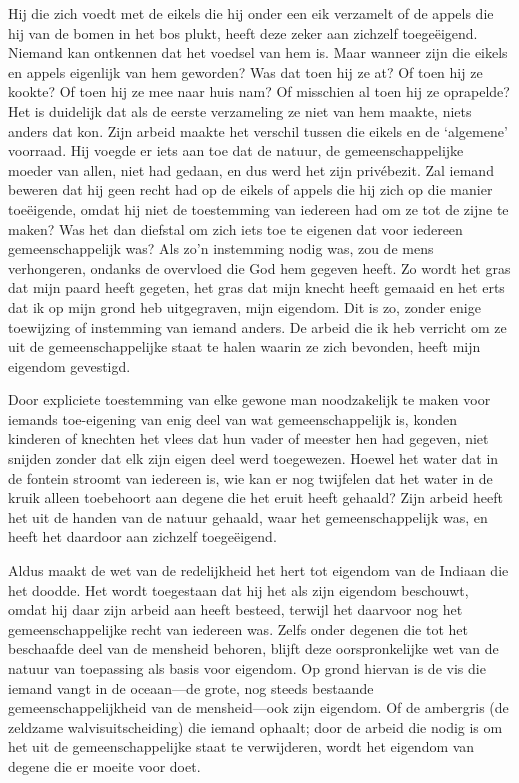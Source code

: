 \documentclass[
  a5paper,
  smalldemyvopaper,10pt,twoside,onecolumn,openright,extrafontsizes,hidelinks]{memoir}
\renewenvironment{quote}%
               {\list{}{\rightmargin=.6cm\leftmargin=.6cm}%
                \itshape \item[]}%
               {\endlist}
\begin{document}
\begin{quote}
Hij die zich voedt met de eikels die hij onder een eik verzamelt of de
appels die hij van de bomen in het bos plukt, heeft deze zeker aan
zichzelf toegeëigend. Niemand kan ontkennen dat het voedsel van hem is.
Maar wanneer zijn die eikels en appels eigenlijk van hem geworden? Was
dat toen hij ze at? Of toen hij ze kookte? Of toen hij ze mee naar huis
nam? Of misschien al toen hij ze oprapelde? Het is duidelijk dat als de
eerste verzameling ze niet van hem maakte, niets anders dat kon. Zijn
arbeid maakte het verschil tussen die eikels en de `algemene' voorraad.
Hij voegde er iets aan toe dat de natuur, de gemeenschappelijke moeder
van allen, niet had gedaan, en dus werd het zijn privébezit. Zal iemand
beweren dat hij geen recht had op de eikels of appels die hij zich op
die manier toeëigende, omdat hij niet de toestemming van iedereen had om
ze tot de zijne te maken? Was het dan diefstal om zich iets toe te
eigenen dat voor iedereen gemeenschappelijk was? Als zo'n instemming
nodig was, zou de mens verhongeren, ondanks de overvloed die God hem
gegeven heeft. Zo wordt het gras dat mijn paard heeft gegeten, het gras
dat mijn knecht heeft gemaaid en het erts dat ik op mijn grond heb
uitgegraven, mijn eigendom. Dit is zo, zonder enige toewijzing of
instemming van iemand anders. De arbeid die ik heb verricht om ze uit de
gemeenschappelijke staat te halen waarin ze zich bevonden, heeft mijn
eigendom gevestigd.

Door expliciete toestemming van elke gewone man noodzakelijk te maken
voor iemands toe-eigening van enig deel van wat gemeenschappelijk is,
konden kinderen of knechten het vlees dat hun vader of meester hen had
gegeven, niet snijden zonder dat elk zijn eigen deel werd toegewezen.
Hoewel het water dat in de fontein stroomt van iedereen is, wie kan er
nog twijfelen dat het water in de kruik alleen toebehoort aan degene die
het eruit heeft gehaald? Zijn arbeid heeft het uit de handen van de
natuur gehaald, waar het gemeenschappelijk was, en heeft het daardoor
aan zichzelf toegeëigend.

Aldus maakt de wet van de redelijkheid het hert tot eigendom van de
Indiaan die het doodde. Het wordt toegestaan dat hij het als zijn
eigendom beschouwt, omdat hij daar zijn arbeid aan heeft besteed,
terwijl het daarvoor nog het gemeenschappelijke recht van iedereen was.
Zelfs onder degenen die tot het beschaafde deel van de mensheid behoren,
blijft deze oorspronkelijke wet van de natuur van toepassing als basis
voor eigendom. Op grond hiervan is de vis die iemand vangt in de
oceaan---de grote, nog steeds bestaande gemeenschappelijkheid van de
mensheid---ook zijn eigendom. Of de ambergris (de zeldzame
walvisuitscheiding) die iemand ophaalt; door de arbeid die nodig is om
het uit de gemeenschappelijke staat te verwijderen, wordt het eigendom
van degene die er moeite voor doet.
\end{quote}
\end{document}
